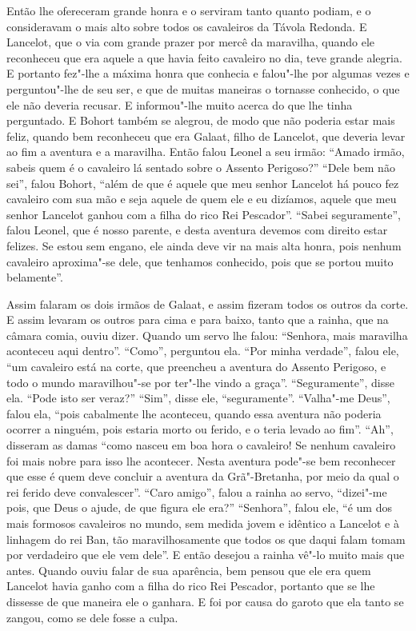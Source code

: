 Então lhe ofereceram grande honra e o serviram tanto quanto podiam, e o
consideravam o mais alto sobre todos os cavaleiros da Távola Redonda. E
Lancelot, que o via com grande prazer por mercê da maravilha, quando ele
reconheceu que era aquele a que havia feito cavaleiro no dia, teve grande
alegria. E portanto fez"-lhe  a máxima honra que conhecia e falou"-lhe por
algumas vezes e perguntou"-lhe de seu ser, e que de muitas maneiras o tornasse
conhecido, o que ele não deveria recusar. E informou"-lhe muito acerca do que
lhe tinha perguntado. E Bohort também se alegrou, de modo que não poderia estar
mais feliz, quando bem reconheceu que era Galaat, filho de Lancelot, que
deveria levar ao fim a aventura e a maravilha. Então falou Leonel a seu irmão:
“Amado irmão, sabeis quem é o cavaleiro lá sentado sobre o Assento Perigoso?”
“Dele bem não sei”, falou Bohort, “além de que é aquele que meu senhor
Lancelot há pouco fez cavaleiro com sua mão e seja aquele de quem ele e eu
dizíamos, aquele que meu senhor Lancelot ganhou com a filha do rico Rei
Pescador”. “Sabei seguramente”, falou Leonel, que é nosso parente, e desta
aventura devemos com direito estar felizes.  Se estou sem engano, ele ainda
deve vir na mais alta honra, pois nenhum cavaleiro aproxima"-se dele, que
tenhamos conhecido, pois que se portou muito belamente”. 

Assim falaram os dois irmãos de Galaat, e assim fizeram todos os outros da
corte. E assim levaram os outros para cima e para baixo, tanto que a rainha,
que na câmara comia, ouviu dizer. Quando um servo lhe falou: “Senhora, mais
maravilha aconteceu aqui dentro”. “Como”, perguntou ela. “Por minha verdade”,
falou ele, “um cavaleiro está na corte, que preencheu a aventura do Assento
Perigoso, e todo o mundo maravilhou"-se por ter"-lhe vindo a graça”.
“Seguramente”, disse ela. “Pode isto ser veraz?” “Sim”, disse ele,
“seguramente”. “Valha"-me Deus”, falou ela, “pois cabalmente lhe aconteceu,
quando essa aventura não poderia ocorrer a ninguém, pois estaria morto ou
ferido, e o teria levado ao fim”. “Ah”, disseram as damas “como nasceu em boa
hora o cavaleiro! Se nenhum cavaleiro foi mais nobre para isso lhe acontecer.
Nesta aventura pode"-se bem reconhecer que esse é quem deve concluir a aventura
da Grã"-Bretanha, por meio da qual o rei ferido deve convalescer”. “Caro
amigo”, falou a rainha ao servo, “dizei"-me pois, que Deus o ajude, de que
figura ele era?” “Senhora”, falou ele, “é um dos mais formosos cavaleiros no
mundo, sem medida jovem e idêntico a Lancelot e à linhagem do rei Ban, tão
maravilhosamente que todos os que daqui falam tomam por verdadeiro que ele vem
dele”. E então desejou a rainha vê"-lo muito mais que antes. Quando ouviu falar
de sua aparência, bem pensou que ele era quem Lancelot havia ganho com a filha
do rico Rei Pescador, portanto que se lhe dissesse de que maneira ele o
ganhara. E foi por causa do garoto que ela tanto se zangou, como se dele fosse
a culpa. 

